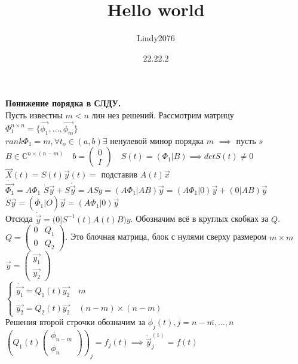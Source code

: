 \documentclass[12pt, a4paper]{article}
\title{Hello world}
\author{Lindy2076}
\date{22.22.2} %
\begin{document}
    \textbf{Понижение порядка в СЛДУ.}\\
    Пусть известны $m < n$ лин нез решений. Рассмотрим матрицу $\Phi_1^{n \times n} = \{ \vec{\phi_1}, \dotsc, \vec{\phi_m} \}$\\
    $rank \Phi_1 = m, \forall t_o \in (a, b) \exists \text{ ненулевой минор порядка } m$
    $\implies $ пусть $ s$\\

    $B \in \mathbb{C}^{n\times (n-m)} \quad b = 
    \left(\begin{matrix}
        0 \\ I %
    \end{matrix}\right) \quad S(t) = (\Phi_1 | B) \implies det S(t) \neq 0$
    $\vec{X}(t) = S(t) \vec{y}(t) = \text{ подставив } A(t) \vec{x}$\\
    $\dot{\vec{\Phi_1}} = A\Phi_1$
    $\dot{S}\vec{y} + S \dot{\vec{y}} = ASy = (A\Phi_1 | AB)\vec{y} = 
    (A\Phi_1 | 0) \vec{y} + (0|AB)\vec{y}
    $\\
    $\dot{S}\vec{y} = (\dot{\Phi_1} | O)\vec{y} = (A\Phi_1 | 0)\vec{y}$\\
    Отсюда $\dot{\vec{y}}= \Big(0 | S^{-1}(t) A(t)B\Big)y$. Обозначим всё в круглых скобках за $Q$.\\
    $Q = \left(\begin{matrix}
        0 & Q_1\\ 0 & Q_2 %
    \end{matrix}\right)$. Это блочная матрица, блок с нулями сверху размером $m \times m$\\
    $\vec{y} = 
    \left(\begin{matrix}
        \vec{y_1} \\ \vec{y_2}
    \end{matrix}\right)$\\
    $\begin{cases}
        \dot{\vec{y_1}} = Q_1(t) \vec{y_2}\quad m\\
        \dot{\vec{y_2}} = Q_2(t) \vec{y_2}\quad (n-m)\times (n-m)
    \end{cases}$\\
    Решения второй строчки обозначим за $\phi_j(t), j=\overline{n-m, \dotsc, n}$\\
    $(Q_1(t)
    \left(\begin{matrix}
        \phi_{n-m}\\\phi_n
    \end{matrix}\right) )_j = f_j(t) \implies \dot{\vec{y}}_j^{(1)} = f(t)$\\
\end{document}
